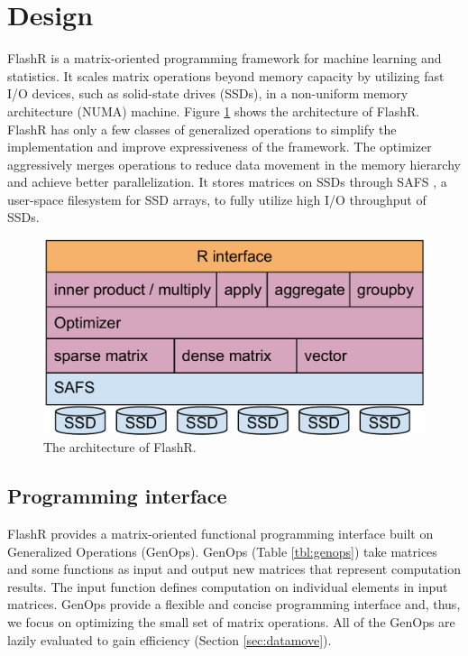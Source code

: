 \section{Design}

FlashR is a matrix-oriented programming framework for machine learning and
statistics. It scales matrix operations beyond memory capacity by utilizing
fast I/O devices, such as solid-state drives (SSDs), in a non-uniform memory
architecture (NUMA) machine. Figure \ref{fig:arch} shows the architecture of
FlashR. FlashR has only a few classes of generalized operations to simplify
the implementation and improve expressiveness of the framework. 
The optimizer aggressively merges operations to
reduce data movement in the memory hierarchy and achieve better parallelization.
It stores matrices on SSDs through SAFS \cite{safs},
a user-space filesystem for SSD arrays, to fully utilize high I/O
throughput of SSDs.

\begin{figure}
\centering
\includegraphics[scale=0.3]{FlashMatrix_figs/architecture.pdf}
\caption{The architecture of FlashR.}
\label{fig:arch}
\end{figure}

\subsection{Programming interface}

FlashR provides a matrix-oriented functional programming interface built
on Generalized Operations (GenOps).  GenOps (Table \ref{tbl:genops}) take matrices and
some functions as input and output new matrices that represent computation results.
The input function defines computation on individual elements in input matrices.
GenOps provide a flexible and concise programming interface and, thus,
we focus on optimizing the small set of matrix operations. All of
the GenOps are lazily evaluated to gain efficiency (Section
\ref{sec:datamove}).

